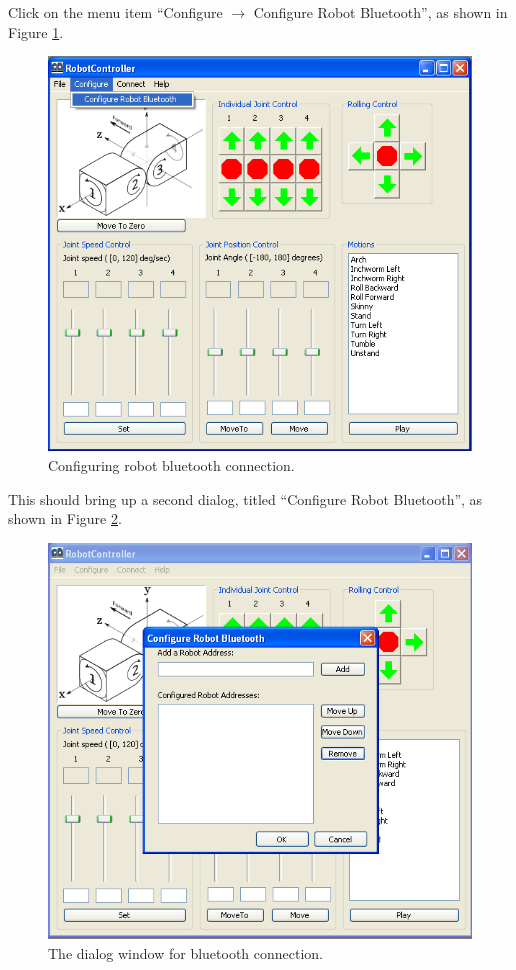 \documentclass{article}
\begin{document}
Click on the menu item ``Configure $\rightarrow$ Configure Robot Bluetooth'', as
shown in Figure \ref{fig:shot3.png}.

\begin{figure}[H]
\begin{center}
\includegraphics[width=4.5in]{images/shot3.png}
\end{center}
\caption{\label{fig:shot3.png} Configuring robot bluetooth connection.}
\end{figure}

This should bring up a second dialog, titled ``Configure Robot Bluetooth'', as
shown in Figure \ref{fig:shot4.png}.

\begin{figure}[H]
\begin{center}
\includegraphics[width=4.5in]{images/shot4.png}
\end{center}
\caption{\label{fig:shot4.png} The dialog window for bluetooth connection.}
\end{figure}
\end{document}
